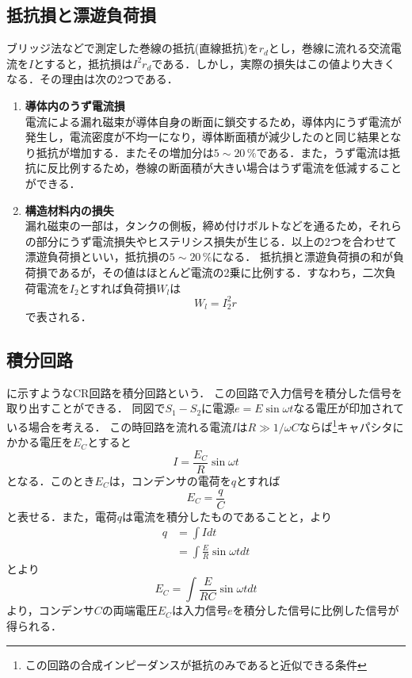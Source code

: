 \subsection{抵抗損と漂遊負荷損\cite{1130282271832577152}}
ブリッジ法などで測定した巻線の抵抗(直線抵抗)を$r_{d}$とし，巻線に流れる交流電流を$I$とすると，抵抗損は$I^{2}r_{d}$である．しかし，実際の損失はこの値より大きくなる．その理由は次の2つである．
\begin{enumerate}[(1)]
	\item \textbf{導体内のうず電流損}\\
	電流による漏れ磁束が導体自身の断面に鎖交するため，導体内にうず電流が発生し，電流密度が不均一になり，導体断面積が減少したのと同じ結果となり抵抗が増加する．またその増加分は$5 \sim 20\,\%$である．また，うず電流は抵抗に反比例するため，巻線の断面積が大きい場合はうず電流を低減することができる\cite{11302822718325772}\cite{1130282270467697152}．
	\item \textbf{構造材料内の損失}\\
	漏れ磁束の一部は，タンクの側板，締め付けボルトなどを通るため，それらの部分にうず電流損失やヒステリシス損失が生じる．以上の2つを合わせて漂遊負荷損といい，抵抗損の$5 \sim 20\,\%$になる．
	抵抗損と漂遊負荷損の和が負荷損であるが，その値はほとんど電流の2乗に比例する．すなわち，二次負荷電流を$I_{2}$とすれば負荷損$W_{l}$は
	\begin{equation}
		W_{l}=I_{2}^{2}r
	\end{equation}
	で表される．
\end{enumerate}

\subsection{積分回路}
に示すようなCR回路を積分回路という．
この回路で入力信号を積分した信号を取り出すことができる．
同図で$S_{1}-S_{2}$に電源$e=E\sin \omega t$なる電圧が印加されている場合を考える．
この時回路を流れる電流$I$は$R\gg 1/\omega C$ならば\footnote{この回路の合成インピーダンスが抵抗のみであると近似できる条件}キャパシタにかかる電圧を$E_{C}$とすると
\begin{equation}
	I=\frac{E_{C}}{R}\sin \omega t
	\label{eq:I}
\end{equation}
となる．このとき$E_{C}$は，コンデンサの電荷を$q$とすれば
\begin{equation}
	E_{C}=\frac{q}{C}
	\label{eq:qcv}
\end{equation}
と表せる．また，電荷$q$は電流を積分したものであることと，より
\begin{align}
	q&=\int I dt\nonumber \\
	&=\int \frac{E}{R}\sin \omega tdt
	\label{eq:int}
\end{align}
とより
\begin{equation}
	E_{C}=\int \frac{E}{RC} \sin \omega tdt
	\label{eq:sekibun}
\end{equation}
より，コンデンサ$C$の両端電圧$E_{C}$は入力信号$e$を積分した信号に比例した信号が得られる．
